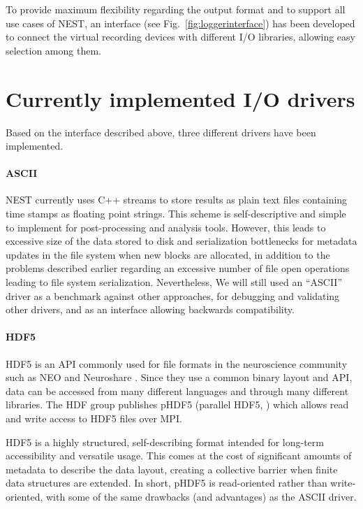 \documentclass[]{YIC2015}
\begin{document}
To provide maximum flexibility regarding the output format and to support all 
use cases of NEST, an interface (see Fig.~\ref{fig:loggerinterface})
has been developed to connect the virtual recording devices with different I/O 
libraries, allowing easy selection among them.


\section{Currently implemented I/O drivers}
\label{sec:io-drivers}

Based on the interface described above, three different drivers have been
implemented.

\paragraph{ASCII}

NEST currently uses C++ streams to store results as plain text files
containing time stamps as floating point strings. This scheme is
self-descriptive and simple to implement for post-processing and
analysis tools. However, this leads to excessive size of the data
stored to disk and serialization bottlenecks for metadata updates in
the file system when new blocks are allocated, in addition to the
problems described earlier regarding an excessive number of file open
operations leading to file system serialization. Nevertheless, We will
still used an ``ASCII'' driver as a benchmark against other
approaches, for debugging and validating other drivers, and as an
interface allowing backwards compatibility.

\paragraph{HDF5}

HDF5 is an API commonly used for file formats in the neuroscience
community such as NEO \cite{neo} and Neuroshare \cite{neuroshare}.
Since they use a common binary layout and API, data can be accessed
from many different languages and through many different libraries.
The HDF group publishes pHDF5 (parallel HDF5, \cite{hdf5}) which
allows read and write access to HDF5 files over MPI.

HDF5 is a highly structured, self-describing format intended for
long-term accessibility and versatile usage. This comes at the cost of
significant amounts of metadata to describe the data layout, creating
a collective barrier when finite data structures are extended. In
short, pHDF5 is read-oriented rather than write-oriented, with some of
the same drawbacks (and advantages) as the ASCII driver.
\end{document}
